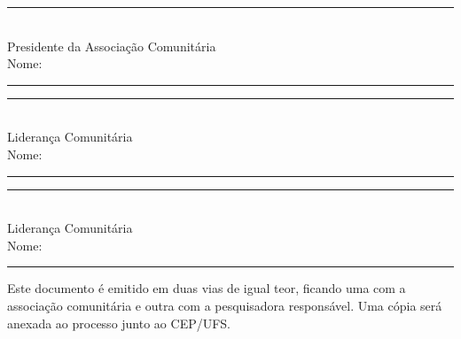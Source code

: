 \documentclass[12pt,a4paper,brazil]{article}
\begin{document}
\vspace{1.5cm}

\noindent
\begin{minipage}[t]{0.48\textwidth}
\centering
\rule{7cm}{0.4pt}\\
Presidente da Associação Comunitária\\
Nome: \rule{5cm}{0.4pt}
\end{minipage}

\vspace{2cm}

\noindent
\begin{minipage}[t]{0.48\textwidth}
\centering
\rule{7cm}{0.4pt}\\
Liderança Comunitária\\
Nome: \rule{5cm}{0.4pt}
\end{minipage}
\hfill
\begin{minipage}[t]{0.48\textwidth}
\centering
\rule{7cm}{0.4pt}\\
Liderança Comunitária\\
Nome: \rule{5cm}{0.4pt}
\end{minipage}

\vspace{1cm}

\noindent
\footnotesize{Este documento é emitido em duas vias de igual teor, ficando uma com a associação comunitária e outra com a pesquisadora responsável. Uma cópia será anexada ao processo junto ao CEP/UFS.}
\end{document}
